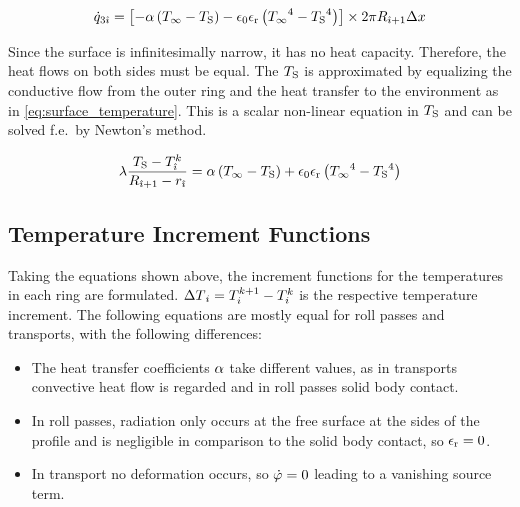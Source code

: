 \documentclass{scrartcl}
\begin{document}
    \begin{equation}
        {\dot{q}}_{3{\hat{\imath}}} = \left[ -{\alpha} \left( {T_\infty} - {T_\mathrm{S}} \right) - {\epsilon_0}{\epsilon_\mathrm{r}}\left( {T_\infty}^4 - {T_\mathrm{S}}^4 \right) \right]
        \times 2 \pi {R}_{{\hat{\imath}}+1} {\Delta x}
        \label{eq:heat_flow_3_surface}
    \end{equation}

    Since the surface is infinitesimally narrow, it has no heat capacity.
    Therefore, the heat flows on both sides must be equal.
    The ${T_\mathrm{S}}$ is approximated by equalizing the conductive flow from the outer ring and the heat transfer to the environment as in \autoref{eq:surface_temperature}.
    This is a scalar non-linear equation in ${T_\mathrm{S}}$ and can be solved f.e.\ by Newton's method.

    \begin{equation}
        {\lambda} \frac{{T_\mathrm{S}} - {T}_{\hat{\imath}}^{k}}{{R}_{{\hat{\imath}}+1} - {r}_{{\hat{\imath}}}} = {\alpha} \left( {T_\infty} - {T_\mathrm{S}} \right) + {\epsilon_0}{\epsilon_\mathrm{r}}\left( {T_\infty}^4 - {T_\mathrm{S}}^4 \right)
        \label{eq:surface_temperature}
    \end{equation}

    \subsection{Temperature Increment Functions}

    Taking the equations shown above, the increment functions for the temperatures in each ring are formulated.
    ${\Delta T}_{i} = {T}_{{i}}^{{k}+1} - {T}_{{i}}^{{k}}$ is the respective temperature increment.
    The following equations are mostly equal for roll passes and transports, with the following differences:
    \begin{itemize}
        \item The heat transfer coefficients ${\alpha}$ take different values, as in transports convective heat flow is regarded and in roll passes solid body contact.
        \item In roll passes, radiation only occurs at the free surface at the sides of the profile and is negligible in comparison to the solid body contact, so ${\epsilon_\mathrm{r}} = 0$.
        \item In transport no deformation occurs, so ${\dot{\varphi}}=0$ leading to a vanishing source term.
    \end{itemize}
\end{document}
